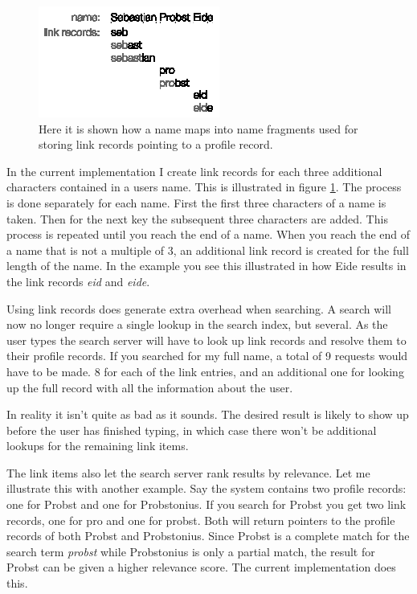 \begin{figure}[htb]
\begin{center}
	\includegraphics[width=0.6\linewidth]{illustrations/LinkRecords.eps}
\caption{Here it is shown how a name maps into name fragments used for storing link records pointing to a profile record.}
\label{figLinkRecord}
\end{center}
\end{figure}

In the current implementation I create link records for each three additional characters contained in a users name. This is illustrated in figure \ref{figLinkRecord}. The process is done separately for each name. First the first three characters of a name is taken. Then for the next key the subsequent three characters are added. This process is repeated until you reach the end of a name. When you reach the end of a name that is not a multiple of 3, an additional link record is created for the full length of the name. In the example you see this illustrated in how Eide results in the link records \emph{eid} and \emph{eide}.

Using link records does generate extra overhead when searching. A search will now no longer require a single lookup in the search index, but several. As the user types the search server will have to look up link records and resolve them to their profile records. If you searched for my full name, a total of 9 requests would have to be made. 8 for each of the link entries, and an additional one for looking up the full record with all the information about the user. 

In reality it isn't quite as bad as it sounds. The desired result is likely to show up before the user has finished typing, in which case there won't be additional lookups for the remaining link items. 

The link items also let the search server rank results by relevance. Let me illustrate this with another example. Say the system contains two profile records: one for Probst and one for Probstonius. If you search for Probst you get two link records, one for pro and one for probst. Both will return pointers to the profile records of both Probst and Probstonius. Since Probst is a complete match for the search term \emph{probst} while Probstonius is only a partial match, the result for Probst can be given a higher relevance score. The current implementation does this.


